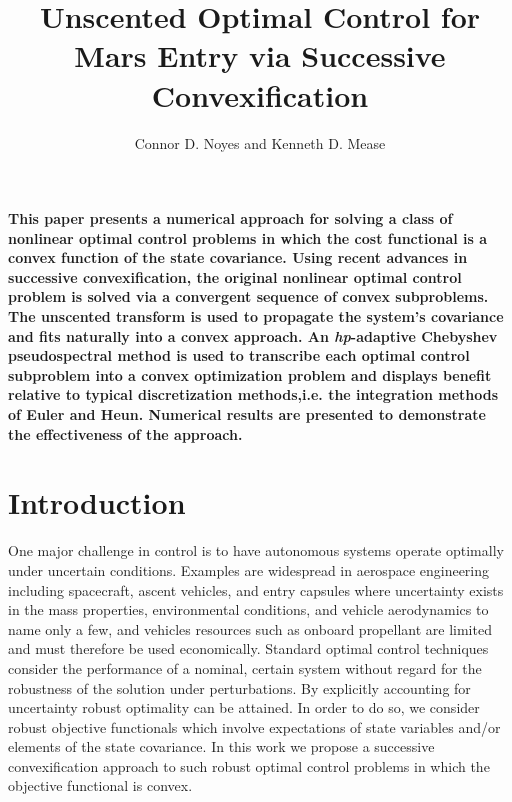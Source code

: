 \documentclass[10pt,a4paper]{article}
\author{Connor D. Noyes and Kenneth D. Mease}
\title{Unscented Optimal Control for Mars Entry via Successive Convexification}
\begin{document}
	\maketitle

	\section*{}
	\textbf{This paper presents a numerical approach for solving a class of nonlinear optimal control problems in which the cost functional is a convex function of the state covariance. Using recent advances in successive convexification, the original nonlinear optimal control problem is solved via a convergent sequence of convex subproblems. The unscented transform is used to propagate the system's covariance and fits naturally into a convex approach. An \textit{hp}-adaptive Chebyshev pseudospectral method is used to transcribe each optimal control subproblem into a convex optimization problem and displays benefit relative to typical discretization methods,i.e. the integration methods of Euler and Heun. Numerical results are presented to demonstrate the effectiveness of the approach.}
	
	\section{Introduction}
	One major challenge in control is to have autonomous systems operate optimally under uncertain conditions. Examples are widespread in aerospace engineering including spacecraft, ascent vehicles, and entry capsules where uncertainty exists in the mass properties, environmental conditions, and vehicle aerodynamics to name only a few, and vehicles resources such as onboard propellant are limited and must therefore be used economically. Standard optimal control techniques consider the performance of a nominal, certain system without regard for the robustness of the solution under perturbations. By explicitly accounting for uncertainty robust optimality can be attained. In order to do so, we consider robust objective functionals which involve expectations of state variables and/or elements of the state covariance. In this work we propose a successive convexification approach to such robust optimal control problems in which the objective functional is convex.
\end{document}
